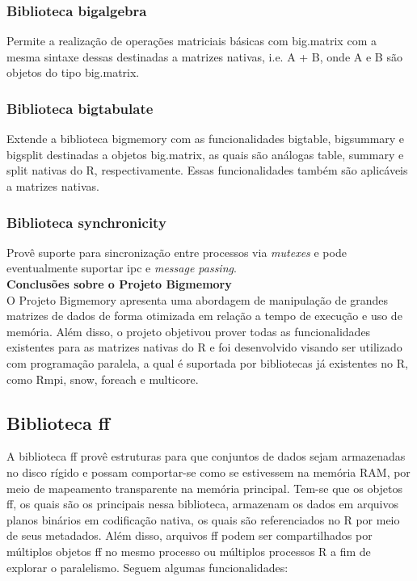 \documentclass[12pt]{article}
\begin{document}
\subsubsection{Biblioteca bigalgebra}

Permite a realização de operações matriciais básicas com big.matrix com a mesma sintaxe dessas destinadas a matrizes nativas, i.e. A + B, onde A e B são objetos do tipo big.matrix.

\subsubsection{Biblioteca bigtabulate}

Extende a biblioteca bigmemory com as funcionalidades bigtable, bigsummary e bigsplit destinadas a objetos big.matrix, as quais são análogas table, summary e split nativas do R, respectivamente. Essas funcionalidades também são aplicáveis a matrizes nativas.

\subsubsection{Biblioteca synchronicity}
Provê suporte para sincronização entre processos via \textit{mutexes} e pode eventualmente suportar ipc e \textit{message passing}.\\

\textbf{Conclusões sobre o Projeto Bigmemory}\\

O Projeto Bigmemory apresenta uma abordagem de manipulação de grandes matrizes de dados de forma otimizada em relação a tempo de execução e uso de memória. Além disso, o projeto objetivou prover todas as funcionalidades existentes para as matrizes nativas do R e foi desenvolvido visando ser utilizado com programação paralela, a qual é suportada por bibliotecas já existentes no R, como Rmpi, snow, foreach e multicore.

\subsection{Biblioteca ff}

A biblioteca ff provê estruturas para que conjuntos de dados sejam armazenadas no disco rígido e possam comportar-se como se estivessem na memória RAM, por meio de mapeamento transparente na memória principal. Tem-se que os objetos ff, os quais são os principais nessa biblioteca, armazenam os dados em arquivos planos binários em codificação nativa, os quais são referenciados no R por meio de seus metadados. Além disso, arquivos ff podem ser compartilhados por múltiplos objetos ff no mesmo processo ou múltiplos processos R a fim de explorar o paralelismo. Seguem algumas funcionalidades:
\end{document}
